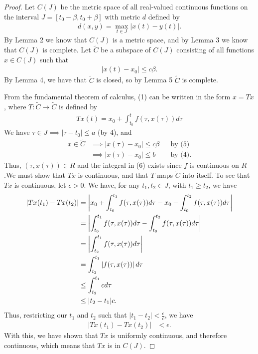 \documentclass[10pt,a4paper]{article}
\theoremstyle{theorem}
\theoremstyle{definition}
\begin{document}
\begin{proof}
Let $C(J)$ be the metric space of all real-valued continuous functions on the interval $J = [t_0 - \beta, t_0 + \beta]$ with metric $d$ defined by 
\begin{align*}
d(x, y) = \max_{t \in J} |x(t) - y(t)|.
\end{align*}
By Lemma 2 we know that $C(J)$ is a metric space, and by Lemma 3 we know that $C(J)$ is complete.  Let $\tilde{C}$ be a subspace of $C(J)$ consisting of all functions $x \in C(J)$ such that 
\begin{align}
|x(t) - x_0| \leq c \beta.
\end{align}
By Lemma 4,  we have that $\tilde{C}$ is closed, so by Lemma 5 $\tilde{C}$ is complete.

From the fundamental theorem of calculus, (1) can be written in the form $x = Tx$, where $T: \tilde{C} \to \tilde{C}$ is defined by 
\begin{align}
Tx(t) = x_0 + \int_{t_0}^{t} f(\tau, x(\tau))d \tau
\end{align}
We have $\tau \in J \implies |\tau - t_0| \leq a$ (by 4), and 
\begin{align*}
x \in \tilde{C} &\implies |x(\tau) - x_0| \leq c \beta &&\text{by (5)}\\
&\implies |x(\tau) - x_0| \leq b &&\text{by (4)}.
\end{align*}
Thus, $(\tau, x(\tau)) \in R$ and the integral in (6) exists since $f$ is continuous on $R$.We must show that $Tx$ is continuous, and that $T$ maps $\tilde{C}$ into itself. To see that $Tx$ is continuous, let $\epsilon >0$. We have, for any $t_1, t_2 \in J$, with $t_1 \geq t_2$, we have
\begin{align*}
|Tx(t_1) - Tx(t_2)| &= \left| x_0 + \int_{t_0}^{t_1} f(\tau, x(\tau))d \tau - x_0 - \int_{t_0}^{t_2} f(\tau, x(\tau))d \tau\Large\right|\\
&= \left|\int_{t_0}^{t_1} f(\tau, x(\tau))d \tau  - \int_{t_0}^{t_2} f(\tau, x(\tau))d \tau\Large\right|\\
&= \left|\int_{t_2}^{t_1} f(\tau, x(\tau))d \tau\Large\right|\\
&= \int_{t_2}^{t_1} \left|f(\tau, x(\tau))\Large\right|d \tau\\
&\leq \int_{t_2}^{t_1} c d \tau\\
&\leq |t_2 - t_1| c.
\end{align*}
Thus, restricting our $t_1$ and $t_2$ such that $|t_1 - t_2| < \frac{\epsilon}{c}$, we have
\begin{align*}
|Tx(t_1) - Tx(t_2)| &< \epsilon.
\end{align*}
With this, we have shown that $Tx$ is uniformly continuous, and therefore continuous, which means that $Tx$ is in $C(J)$.


\end{proof}
\end{document}
